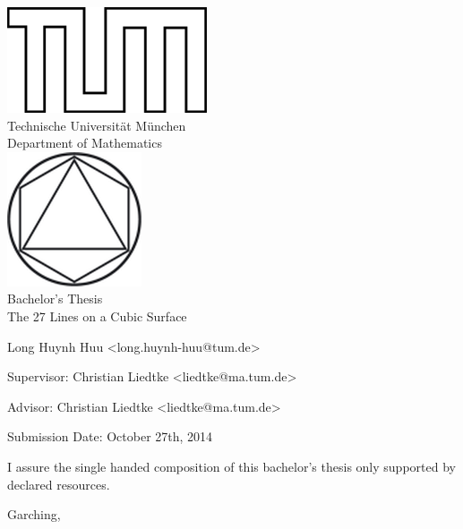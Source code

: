 \begin{titlepage}
\begin{center}
\includegraphics{TUMlschwarz.png}\\[3mm]
\sf
{\Large
  Technische Universit\"at M\"unchen\\[5mm]
  Department of Mathematics\\[8mm]
}
\normalsize
\includegraphics{TUMlMschwarz.png}\\[15mm]

Bachelor's Thesis\\[15mm]

{\Huge
  The 27 Lines on a Cubic Surface
}
\bigskip

\normalsize

Long Huynh Huu <long.huynh-huu@tum.de>
\end{center}
\vspace*{75mm}

Supervisor: Christian Liedtke <liedtke@ma.tum.de>
\medskip

Advisor: Christian Liedtke <liedtke@ma.tum.de>
\medskip

Submission Date: October 27th, 2014

\end{titlepage}


\vspace*{150mm}

I assure the single handed composition of this bachelor's thesis only supported by declared resources.
\bigskip

Garching, 
\newpage
